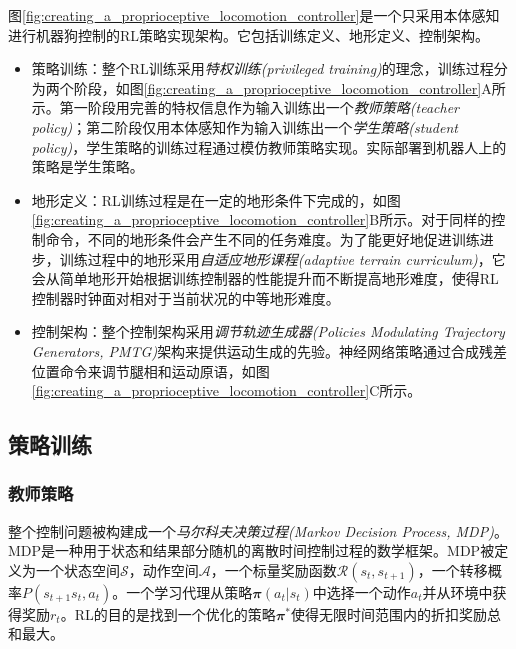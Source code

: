   图\ref{fig:creating_a_proprioceptive_locomotion_controller}是一个只采用本体感知进行机器狗控制的RL策略实现架构。它包括训练定义、地形定义、控制架构。
  \begin{itemize}
    \item 策略训练：整个RL训练采用\emph{特权训练(privileged training)}\cite[p]{Chen_Zhou_Koltun_Krähenbühl_2019}的理念，训练过程分为两个阶段，如图\ref{fig:creating_a_proprioceptive_locomotion_controller}A所示。第一阶段用完善的特权信息作为输入训练出一个\emph{教师策略(teacher policy)}；第二阶段仅用本体感知作为输入训练出一个\emph{学生策略(student policy)}，学生策略的训练过程通过模仿教师策略实现。实际部署到机器人上的策略是学生策略。
    \item 地形定义：RL训练过程是在一定的地形条件下完成的，如图\ref{fig:creating_a_proprioceptive_locomotion_controller}B所示。对于同样的控制命令，不同的地形条件会产生不同的任务难度。为了能更好地促进训练进步，训练过程中的地形采用\emph{自适应地形课程(adaptive terrain curriculum)}，它会从简单地形开始根据训练控制器的性能提升而不断提高地形难度，使得RL控制器时钟面对相对于当前状况的中等地形难度。
    \item 控制架构：整个控制架构采用\emph{调节轨迹生成器(Policies Modulating Trajectory Generators, PMTG)\cite[p]{Iscen_Caluwaerts_Tan_Zhang_Coumans_Sindhwani_Vanhoucke_2018}}架构来提供运动生成的先验。神经网络策略通过合成残差位置命令来调节腿相和运动原语，如图\ref{fig:creating_a_proprioceptive_locomotion_controller}C所示。
  \end{itemize}


\subsection[策略训练]{策略训练}
\subsubsection[教师策略]{教师策略}
整个控制问题被构建成一个\emph{马尔科夫决策过程(Markov Decision Process, MDP)}。MDP是一种用于状态和结果部分随机的离散时间控制过程的数学框架。MDP被定义为一个状态空间$\mathcal{S}$，动作空间$\mathcal{A}$，一个标量奖励函数$\mathcal{R}(s_t,s_{t+1})$，一个转移概率$P(s_{t+1}s_t, a_t)$。一个学习代理从策略$\mathbfit{\pi}(a_t|s_t)$中选择一个动作$a_t$并从环境中获得奖励$r_t$。RL的目的是找到一个优化的策略$\mathbfit{\pi}^*$使得无限时间范围内的折扣奖励总和最大。


